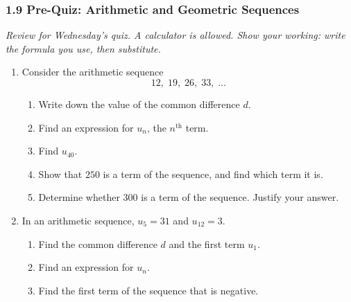 \documentclass[12pt, twoside]{article}
\begin{document}
\subsubsection*{1.9 Pre-Quiz: Arithmetic and Geometric Sequences}

\emph{Review for Wednesday's quiz. A calculator is allowed. Show your
working: write the formula you use, then substitute.}

\begin{enumerate}[itemsep=0.15cm]

\item[1.]

Consider the arithmetic sequence
$$12,\; 19,\; 26,\; 33,\; \ldots$$

\begin{enumerate}[itemsep=0.1cm]
  \item Write down the value of the common difference $d$.
  \item Find an expression for $u_{n}$, the $n^{\text{th}}$ term.
  \item Find $u_{40}$.
  \item Show that $250$ is a term of the sequence, and find which term
  it is.
  \item Determine whether $300$ is a term of the sequence. Justify your
  answer.
\end{enumerate}


\newpage

\item[2.]

In an arithmetic sequence, $u_{5} = 31$ and $u_{12} = 3$.

\begin{enumerate}[itemsep=0.1cm]
  \item Find the common difference $d$ and the first term $u_{1}$.
  \item Find an expression for $u_{n}$.
  \item Find the first term of the sequence that is negative.
\end{enumerate}


\end{enumerate}
\end{document}
